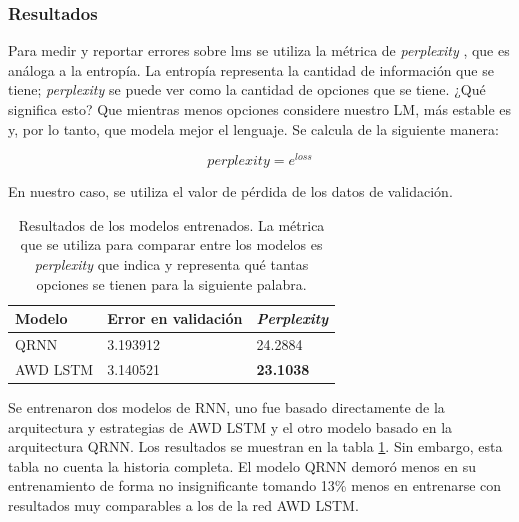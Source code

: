 \subsubsection{Resultados}

Para medir y reportar errores sobre \glspl{lm} se utiliza la métrica de \textit{perplexity} \parencite{jurafsky2014speech}, que es análoga a la entropía. La entropía representa la cantidad de información que se tiene; \textit{perplexity} se puede ver como la cantidad de opciones que se tiene. ¿Qué significa esto? Que mientras menos opciones considere nuestro LM, más estable es y, por lo tanto, que modela mejor el lenguaje. Se calcula de la siguiente manera:

$$ perplexity = e^{loss} $$

En nuestro caso, se utiliza el valor de pérdida de los datos de validación.

\begin{table}
\centering
\begin{tabular}{|l|l|l|}
\hline
Modelo & Error en validación & \textit{Perplexity} \\
\hline
QRNN & 3.193912 & 24.2884 \\
AWD LSTM & 3.140521 & \textbf{23.1038} \\
\hline
\end{tabular}
\caption{Resultados de los modelos entrenados. La métrica que se utiliza para comparar entre los modelos es \textit{perplexity} que indica y representa qué tantas opciones se tienen para la siguiente palabra.}
\label{tab:modresults}
\end{table}

Se entrenaron dos modelos de RNN, uno fue basado directamente de la arquitectura y estrategias de AWD LSTM  y el otro modelo basado en la arquitectura QRNN. Los resultados se muestran en la tabla \ref{tab:modresults}. Sin embargo, esta tabla no cuenta la historia completa. El modelo QRNN demoró menos en su entrenamiento de forma no insignificante tomando 13\% menos en entrenarse con resultados muy comparables a los de la red AWD LSTM.

